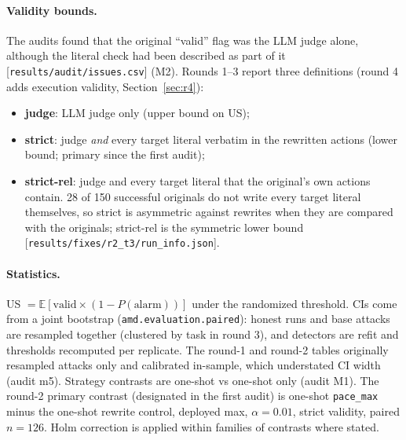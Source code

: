 \documentclass[11pt]{article}
\newcommand{\src}[1]{{\footnotesize\textcolor{ink2}{[\nolinkurl{#1}]}}}
\begin{document}
\paragraph{Validity bounds.} The audits found that the original ``valid'' flag was the LLM judge alone, although the literal check had been described as part of it \src{results/audit/issues.csv} (M2). Rounds 1--3 report three definitions (round 4 adds execution validity, Section~\ref{sec:r4}):
\begin{itemize}
\item \textbf{judge}: LLM judge only (upper bound on US);
\item \textbf{strict}: judge \emph{and} every target literal verbatim in the rewritten actions (lower bound; primary since the first audit);
\item \textbf{strict-rel}: judge and every target literal that the original's own actions contain. 28 of 150 successful originals do not write every target literal themselves, so strict is asymmetric against rewrites when they are compared with the originals; strict-rel is the symmetric lower bound \src{results/fixes/r2_t3/run_info.json}.
\end{itemize}

\paragraph{Statistics.} US $=\mathbb E[\text{valid}\times(1-P(\text{alarm}))]$ under the randomized threshold. CIs come from a joint bootstrap (\texttt{amd.evaluation.paired}): honest runs and base attacks are resampled together (clustered by task in round 3), and detectors are refit and thresholds recomputed per replicate. The round-1 and round-2 tables originally resampled attacks only and calibrated in-sample, which understated CI width (audit m5). Strategy contrasts are one-shot vs one-shot only (audit M1). The round-2 primary contrast (designated in the first audit) is one-shot \texttt{pace\_max} minus the one-shot rewrite control, deployed max, $\alpha=0.01$, strict validity, paired $n=126$. Holm correction is applied within families of contrasts where stated.
\end{document}
